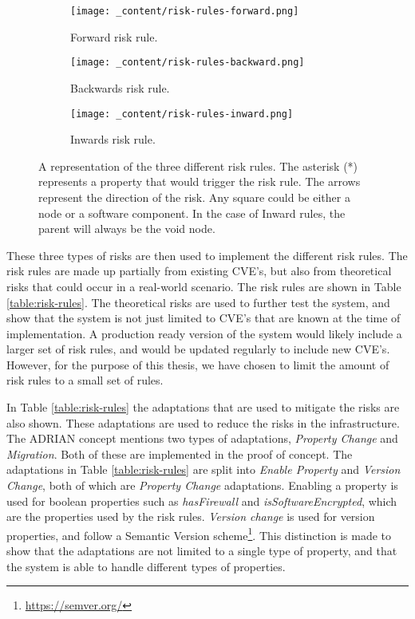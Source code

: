 \begin{figure}[H]
    \begin{subfigure}[b]{0.3\textwidth}
        \centering
        \texttt{[image: \_content/risk-rules-forward.png]}
        \caption{Forward risk rule.}
        \label{fig:risk-rule-forward}
    \end{subfigure}
    \begin{subfigure}[b]{0.3\textwidth}
        \centering
        \texttt{[image: \_content/risk-rules-backward.png]}
        \caption{Backwards risk rule.}
        \label{fig:risk-rule-backward}
    \end{subfigure}
    \begin{subfigure}[b]{0.3\textwidth}
        \centering
        \texttt{[image: \_content/risk-rules-inward.png]}
        \caption{Inwards risk rule.}
        \label{fig:risk-rule-inward}
    \end{subfigure}
    \caption{A representation of the three different risk rules. The asterisk (*) represents a property that would trigger the risk rule. The arrows represent the direction of the risk. Any square could be either a node or a software component. In the case of Inward rules, the parent will always be the void node.}
    \label{fig:risk-rules}
\end{figure}

These three types of risks are then used to implement the different risk rules. The risk rules are made up partially from existing CVE's, but also from theoretical risks that could occur in a real-world scenario. The risk rules are shown in Table \ref{table:risk-rules}. The theoretical risks are used to further test the system, and show that the system is not just limited to CVE's that are known at the time of implementation. A production ready version of the system would likely include a larger set of risk rules, and would be updated regularly to include new CVE's. However, for the purpose of this thesis, we have chosen to limit the amount of risk rules to a small set of rules.

In Table \ref{table:risk-rules} the adaptations that are used to mitigate the risks are also shown. These adaptations are used to reduce the risks in the infrastructure. The ADRIAN concept \cite{mann2023ADRIAN} mentions two types of adaptations, \emph{Property Change} and \emph{Migration}. Both of these are implemented in the proof of concept. The adaptations in Table \ref{table:risk-rules} are split into \emph{Enable Property} and \emph{Version Change}, both of which are \emph{Property Change} adaptations. Enabling a property is used for boolean properties such as \emph{hasFirewall} and \emph{isSoftwareEncrypted}, which are the properties used by the risk rules. \emph{Version change} is used for version properties, and follow a Semantic Version scheme\footnote{\url{https://semver.org/}}. This distinction is made to show that the adaptations are not limited to a single type of property, and that the system is able to handle different types of properties.

